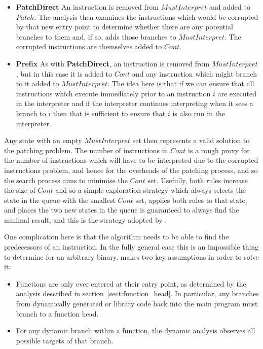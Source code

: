 \begin{itemize}
\item
  \textbf{PatchDirect} An instruction is removed from $MustInterpret$
  and added to $Patch$.  The analysis then examines the instructions
  which would be corrupted by that new entry point to determine
  whether there are any potential branches to them and, if so, adds
  those branches to $MustInterpret$.  The corrupted instructions are
  themselves added to $Cont$.

\item
  \textbf{Prefix} As with \textbf{PatchDirect}, an instruction is
  removed from $MustInterpret$, but in this case it is added to $Cont$
  and any instruction which might branch to it added to
  $MustInterpret$.  The idea here is that if we can ensure that all
  instructions which execute immediately prior to an instruction $i$
  are executed in the interpreter and if the interpreter continues
  interpreting when it sees a branch to $i$ then that is sufficient
  to ensure that $i$ is also run in the interpreter.
\end{itemize}

Any state with an empty $MustInterpret$ set then represents a valid
solution to the patching problem.  The number of instructions in
$Cont$ is a rough proxy for the number of instructions which will have
to be interpreted due to the corrupted instructions problem, and hence
for the overheads of the patching process, and so the search process
aims to minimise the $Cont$ set.  Usefully, both rules increase the
size of $Cont$ and so a simple exploration strategy which always
selects the state in the queue with the smallest $Cont$ set, applies
both rules to that state, and places the two new states in the queue
is guaranteed to always find the minimal result, and this is the
strategy adopted by {\technique}.

One complication here is that the algorithm needs to be able to find
the predecessors of an instruction.  In the fully general case this is
an impossible thing to determine for an arbitrary binary.
{\Technique} makes two key assumptions in order to solve it:

\begin{itemize}
\item
  Functions are only ever entered at their entry point, as determined
  by the analysis described in section~\ref{sect:function_head}.  In
  particular, any branches from dynamically generated or library code
  back into the main program must branch to a function head.
\item
  For any dynamic branch within a function, the dynamic analysis
  observes all possible targets of that branch.
\end{itemize}

